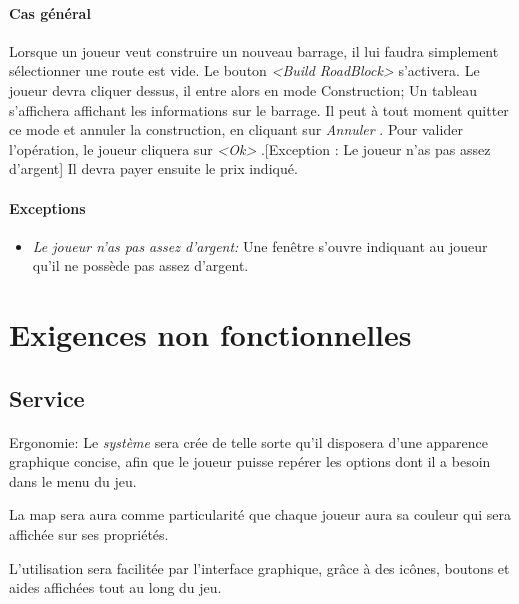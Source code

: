 \documentclass[a4paper,11pt]{report}
\begin{document}
\paragraph{Cas général}
Lorsque un joueur veut construire un nouveau barrage, il lui faudra simplement sélectionner une route est vide. Le bouton \og \textit{<Build RoadBlock>} \fg s'activera. Le joueur devra cliquer dessus, il entre alors en mode Construction; Un tableau s'affichera affichant les informations sur le barrage. Il peut à tout moment quitter ce mode et annuler la construction, en cliquant sur \og \textit{Annuler} \fg. Pour valider l'opération, le joueur cliquera sur \og \textit{<Ok>} \fg.[Exception : Le joueur n'as pas assez d'argent] Il devra payer ensuite le prix indiqué.
\paragraph{Exceptions}
\begin{itemize}
	\item \textit{Le joueur n'as pas assez d'argent:}  Une fenêtre s'ouvre indiquant au joueur qu'il ne possède pas assez d'argent.
\end{itemize}




\newpage
\section{Exigences non fonctionnelles}
\subsection{Service}
\paragraph{}Ergonomie:  \newline
Le \textit{système} sera crée de telle sorte qu'il disposera d’une apparence graphique concise, afin que le joueur puisse repérer les options dont il a besoin dans le menu du jeu.

La map sera aura comme particularité que chaque joueur aura sa couleur qui sera affichée sur ses propriétés.

L'utilisation sera facilitée par l'interface graphique, grâce à des icônes, boutons et aides affichées tout au long du jeu.
\end{document}
